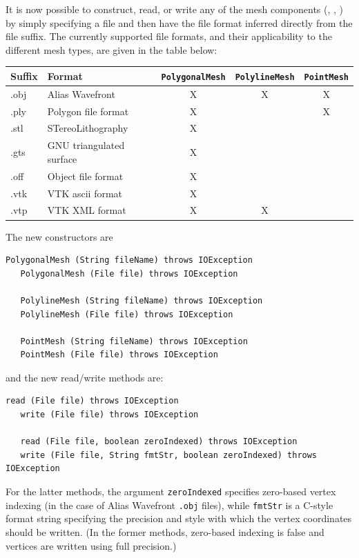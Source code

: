 \documentclass{article}
\begin{document}
It is now possible to construct, read, or write any of the mesh
components (,
,
) by simply specifying a file
and then have the file format inferred directly from the file suffix.
The currently supported file formats, and their applicability to the
different mesh types, are given in the table below:

\begin{center}
\begin{tabular}{|ll|ccc|}
\hline
Suffix & Format & {\tt PolygonalMesh} & {\tt PolylineMesh} & {\tt PointMesh} \\
\hline
.obj & Alias Wavefront &X&X&X\\
.ply & Polygon file format &X&&X\\
.stl & STereoLithography &X&&\\
.gts & GNU triangulated surface &X&&\\
.off & Object file format &X&&\\
.vtk & VTK ascii format &X&&\\
.vtp & VTK XML format &X&X&\\
\hline
\end{tabular}
\end{center}

The new constructors are
%
\begin{lstlisting}[]
   PolygonalMesh (String fileName) throws IOException
   PolygonalMesh (File file) throws IOException

   PolylineMesh (String fileName) throws IOException
   PolylineMesh (File file) throws IOException

   PointMesh (String fileName) throws IOException
   PointMesh (File file) throws IOException
\end{lstlisting}
%
and the new read/write methods are:
\begin{lstlisting}[]
   read (File file) throws IOException
   write (File file) throws IOException

   read (File file, boolean zeroIndexed) throws IOException
   write (File file, String fmtStr, boolean zeroIndexed) throws IOException
\end{lstlisting}
%
For the latter methods, the argument {\tt zeroIndexed} specifies
zero-based vertex indexing (in the case of Alias Wavefront {\tt .obj}
files), while {\tt fmtStr} is a C-style format string specifying the
precision and style with which the vertex coordinates should be
written. (In the former methods, zero-based indexing is false and
vertices are written using full precision.)
\end{document}
